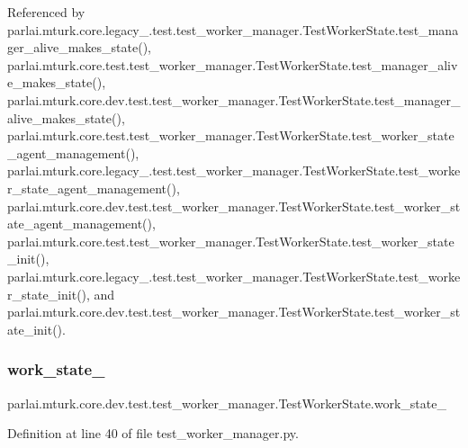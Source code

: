 Referenced by parlai.\+mturk.\+core.\+legacy\+\_.\+test.\+test\+\_\+worker\+\_\+manager.\+Test\+Worker\+State.\+test\+\_\+manager\+\_\+alive\+\_\+makes\+\_\+state(), parlai.\+mturk.\+core.\+test.\+test\+\_\+worker\+\_\+manager.\+Test\+Worker\+State.\+test\+\_\+manager\+\_\+alive\+\_\+makes\+\_\+state(), parlai.\+mturk.\+core.\+dev.\+test.\+test\+\_\+worker\+\_\+manager.\+Test\+Worker\+State.\+test\+\_\+manager\+\_\+alive\+\_\+makes\+\_\+state(), parlai.\+mturk.\+core.\+test.\+test\+\_\+worker\+\_\+manager.\+Test\+Worker\+State.\+test\+\_\+worker\+\_\+state\+\_\+agent\+\_\+management(), parlai.\+mturk.\+core.\+legacy\+\_.\+test.\+test\+\_\+worker\+\_\+manager.\+Test\+Worker\+State.\+test\+\_\+worker\+\_\+state\+\_\+agent\+\_\+management(), parlai.\+mturk.\+core.\+dev.\+test.\+test\+\_\+worker\+\_\+manager.\+Test\+Worker\+State.\+test\+\_\+worker\+\_\+state\+\_\+agent\+\_\+management(), parlai.\+mturk.\+core.\+test.\+test\+\_\+worker\+\_\+manager.\+Test\+Worker\+State.\+test\+\_\+worker\+\_\+state\+\_\+init(), parlai.\+mturk.\+core.\+legacy\+\_.\+test.\+test\+\_\+worker\+\_\+manager.\+Test\+Worker\+State.\+test\+\_\+worker\+\_\+state\+\_\+init(), and parlai.\+mturk.\+core.\+dev.\+test.\+test\+\_\+worker\+\_\+manager.\+Test\+Worker\+State.\+test\+\_\+worker\+\_\+state\+\_\+init().

\mbox{\label{classparlai_1_1mturk_1_1core_1_1dev_1_1test_1_1test__worker__manager_1_1TestWorkerState_af3884b73e7eb38cec97e46256049d786}} 
\subsubsection{\texorpdfstring{work\+\_\+state\+\_}{work\_state\_2}}
{\footnotesize\ttfamily parlai.\+mturk.\+core.\+dev.\+test.\+test\+\_\+worker\+\_\+manager.\+Test\+Worker\+State.\+work\+\_\+state\+\_}



Definition at line 40 of file test\+\_\+worker\+\_\+manager.\+py.



